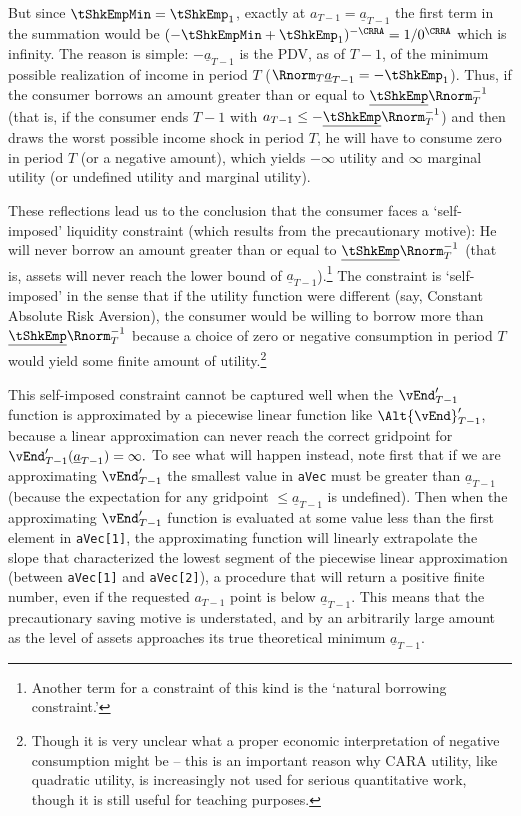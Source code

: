 \documentclass[titlepage]{\econtex}
\begin{document}
But since $\tShkEmpMin=\tShkEmp_{1}$, exactly at
${a}_{T-1}=\underline{a}_{T-1}$ the first term in the summation would
be $(-\tShkEmpMin+\tShkEmp_{1})^{-\CRRA}=1/0^{\CRRA}$ which is
infinity.  The reason is simple: $-\underline{a}_{T-1}$ is
the PDV, as of $T-1$, of the minimum possible realization of income in
period $T$ ($\Rnorm_{T}\underline{a}_{T-1} = -\tShkEmp_{1}$).  Thus,
if the consumer borrows an amount greater than or equal to
$\underline{\tShkEmp}\Rnorm_{T}^{-1}$ (that is, if the consumer ends
$T-1$ with ${a}_{T-1} \leq -\underline{\tShkEmp}\Rnorm_{T}^{-1}$) and
then draws the worst possible income shock in period $T$, he will have
to consume zero in period $T$ (or a negative amount), which yields
$-\infty$ utility and $\infty$ marginal utility (or undefined utility
and marginal utility).

These reflections lead us to the conclusion that the consumer faces a
`self-imposed' liquidity constraint (which results from the
precautionary motive): He will never borrow an amount greater
than or equal to $\underline{\tShkEmp}\Rnorm_{T}^{-1}$ (that is,
assets will never reach the lower bound of
$\underline{a}_{T-1}$).\footnote{Another term for a constraint of this
  kind is the `natural borrowing constraint.'}  The constraint is
`self-imposed' in the sense that if the utility function were
different (say, Constant Absolute Risk Aversion), the consumer would
be willing to borrow more than $\underline{\tShkEmp}\Rnorm_{T}^{-1}$
because a choice of zero or negative consumption in period $T$ would
yield some finite amount of utility.\footnote{Though it is very unclear what a
  proper economic interpretation of negative consumption might be --
  this is an important reason why CARA utility, like quadratic utility,
  is increasingly not used for serious quantitative work, though it is
  still useful for teaching purposes.}

This self-imposed constraint cannot be captured well when the
$\vEnd^{\prime}_{T-1}$ function is approximated by a piecewise
linear function like $\Alt{\vEnd}^{\prime}_{T-1}$, because a
linear approximation can never reach the correct gridpoint for
$\vEnd^{\prime}_{T-1}(\underline{a}_{T-1})=\infty.$ To see what
will happen instead, note first that if we are approximating $\vEnd^{\prime}_{T-1}$ the smallest value in
\texttt{aVec} must be greater than $\underline{a}_{T-1}$
(because the expectation for any gridpoint $\leq \underline{a}_{T-1}$ is undefined).  Then when the
approximating $\vEnd^{\prime}_{T-1}$ function is evaluated at
some value less than the first element in \texttt{aVec[1]}, the
approximating function will linearly extrapolate the slope that
characterized the lowest segment of the piecewise linear approximation
(between \texttt{aVec[1]} and \texttt{aVec[2]}), a
procedure that will return a positive finite number, even if the
requested ${a}_{T-1}$ point is below $\underline{a}_{T-1}$.  This means that the
precautionary saving motive is understated, and by an arbitrarily
large amount as the level of assets approaches its true theoretical
minimum $\underline{a}_{T-1}$.
\end{document}
